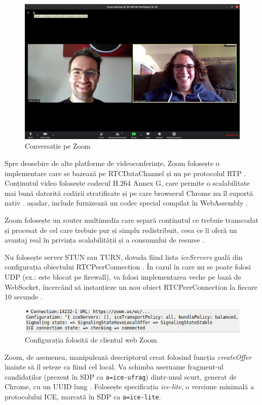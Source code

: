 \begin{figure}[!htbp]
    \centering
    \includegraphics[width=13cm]{figures/zoom_call.jpg}
    \caption{Conversație pe Zoom}
\end{figure}
\indent \par Spre deosebire de alte platforme de videoconferințe, Zoom folosește o implementare care se bazează pe RTCDataChannel și nu pe protocolul RTP \cite{ZoomWebRTC}. Conținutul video folosește codecul H.264 Annex G, care permite o scalabilitate mai bună datorită codării stratificate și pe care browserul Chrome nu îl suportă nativ \cite{ZoomScalability, ZoomWebRTC}. așadar, include furnizează un codec special compilat în WebAssembly \cite{ZoomWebRTC}.
\indent \par Zoom folosește un router multimedia care separă conținutul ce trebuie transcodat și procesat de cel care trebuie pur și simplu redistribuit, ceea ce îi oferă un avantaj real în privința scalabilității și a consumului de resurse \cite{ZoomScalability}.
\indent \par Nu folosește server STUN sau TURN, dovada fiind lista \textit{iceServers} goală din configurația obiectului RTCPeerConnection \cite{ZoomWebRTC}. În cazul în care nu se poate folosi UDP (ex.: este blocat pe firewall), va folosi implementarea veche pe bază de WebSocket, încercând să instanțieze un nou obiect RTCPeerConnection la fiecare 10 secunde \cite{ZoomWebRTC}.
\begin{figure}[!htbp]
    \centering
    \includegraphics[width=14cm]{figures/zoom_no_ice_servers.png}
    \caption{Configurația folosită de clientul web Zoom}
\end{figure}
\indent \par Zoom, de asemenea, manipulează descriptorul creat folosind funcția \textit{createOffer} înainte să îl seteze ca fiind cel local. Va schimba username fragment-ul candidaților (prezent în SDP ca \texttt{a=ice-ufrag}) dintr-unul scurt, generat de Chrome, cu un UUID lung \cite{ZoomWebRTC}. Folosește specificația \textit{ice-lite}, o versiune minimală a protocolului ICE, marcată în SDP ca \texttt{a=ice-lite}.